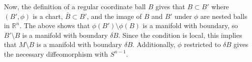 \documentclass[10pt,letter]{article}
\begin{document}
Now, the definition of a regular coordinate ball $B$ gives that $B \subset B'$ where $(B',\phi)$ is a chart, $\bar{B} \subset B'$, and the image of $B$ and $B'$ under $\phi$ are nested balls in $\mathbb{R}^n$. The above shows that $\phi(B') \setminus \phi(B)$ is a manifold with boundary, so $B' \setminus B$ is a manifold with boundary $\delta B$. Since the condition is local, this implies that $M \setminus B$ is a manifold with boundary $\delta B$. Additionally, $\phi$ restricted to $\delta B$ gives the necessary diffeomorphism with $S^{n-1}$. 
\end{document}

